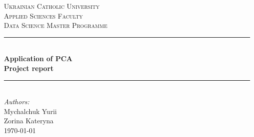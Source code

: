 \documentclass[12pt]{article}
\begin{document}
\begin{titlepage}

\newcommand{\HRule}{\rule{\linewidth}{0.5mm}} %

\center %
 

\textsc{\LARGE Ukrainian Catholic University}\\[1cm] %
\textsc{\Large Applied Sciences Faculty}\\[0.5cm] %
\textsc{\large Data Science Master Programme}\\[0.5cm] %


\HRule \\[0.4cm]
{ \huge \bfseries Application of PCA}\\[10pt]
{\Large \bfseries Project report}\\[0.4cm] %
\HRule \\[1cm]
 


\Large \emph{Authors:}\\
Mychalchuk Yurii\\Zorina Kateryna\\[1cm] %


{\large \today}\\[2cm] %



\end{titlepage}
\end{document}
